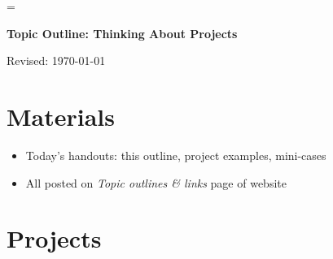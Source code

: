 \documentclass[11pt]{article}
\begin{document}
\parskip=\bigskipamount
\parindent=0.0in
\thispagestyle{empty}


\bigskip\bigskip
\centerline{\Large \bf Topic Outline:  Thinking About Projects}
\centerline{Revised: \today}

\section*{Materials}

\begin{itemize}
\item  Today's handouts:  this outline, project examples, mini-cases
\item  All posted on {\it Topic outlines \& links\/} page of website
\end{itemize}


\section*{Projects}
\end{document}
